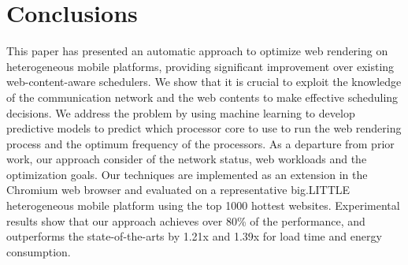 \section{Conclusions}

This paper has presented an automatic approach to optimize web rendering on heterogeneous mobile platforms, providing significant
improvement over existing web-content-aware schedulers. We show that it is crucial to exploit the knowledge of the communication network
and the web contents to make effective scheduling decisions. We address the problem by using machine learning to develop predictive models
to predict which processor core to use to run the web rendering process and the optimum frequency of the processors. As a departure from
prior work, our approach consider of the network status, web workloads and the optimization goals. Our techniques are implemented as an
extension in the Chromium web browser and evaluated on a representative big.LITTLE heterogeneous mobile platform using the top 1000 hottest
websites. Experimental results show that our approach achieves over 80\% of the \oracle performance, and outperforms the state-of-the-arts
by 1.21x and 1.39x for load time and energy consumption.

